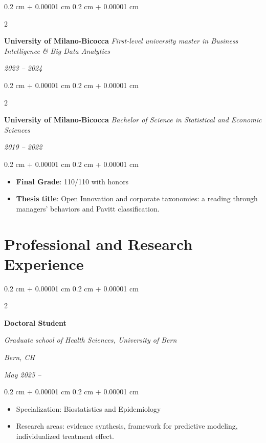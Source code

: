 \documentclass[10pt, letterpaper]{article}
\newenvironment{highlights}{
    \begin{itemize}[
        topsep=0.10 cm,
        parsep=0.10 cm,
        partopsep=0pt,
        itemsep=0pt,
        leftmargin=0.4 cm + 10pt
    ]
}{
    \end{itemize}
} %
\newenvironment{onecolentry}{
    \begin{adjustwidth}{
        0.2 cm + 0.00001 cm
    }{
        0.2 cm + 0.00001 cm
    }
}{
    \end{adjustwidth}
} %
\newenvironment{twocolentry}[2][]{
    \onecolentry
    \def\secondColumn{#2}
    \setcolumnwidth{\fill, 4.5 cm}
    \begin{paracol}{2}
}{
    \switchcolumn \raggedleft \secondColumn
    \end{paracol}
    \endonecolentry
} %
\begin{document}
        \begin{twocolentry}{         
        \textit{2023 – 2024}}
            \textbf{University of Milano-Bicocca}
            \textit{First-level university master in Business Intelligence \& Big Data Analytics}
        \end{twocolentry}
        \vspace{0.25 cm}

        \begin{twocolentry}{         
        \textit{2019 – 2022}}
            \textbf{University of Milano-Bicocca}
            \textit{Bachelor of Science in Statistical and Economic Sciences}
        \end{twocolentry}
        \vspace{0.10 cm}
        \begin{onecolentry}
            \begin{highlights}
                \item \textbf{Final Grade}: 110/110 with honors
                \item \textbf{Thesis title}: Open Innovation and corporate taxonomies: a reading through managers' behaviors and Pavitt classification.
            \end{highlights}
        \end{onecolentry}

    
    \section{Professional and Research Experience}
     
        \begin{twocolentry}{
        \textit{Bern, CH}    
            
        \textit{May 2025 – }}
            \textbf{Doctoral Student}
            
            \textit{Graduate school of Health Sciences, University of Bern}
        \end{twocolentry}

        \vspace{0.10 cm}
        \begin{onecolentry}
            \begin{highlights}
            \item Specialization: Biostatistics and Epidemiology
                \item Research areas: evidence synthesis, framework for predictive modeling, individualized treatment effect.
            \end{highlights}
        \end{onecolentry}
\end{document}
